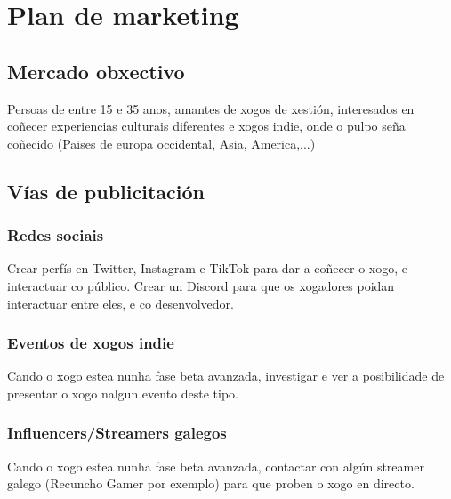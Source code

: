 \documentclass{report}  %
\begin{document}
\section{Plan de marketing}
\subsection{Mercado obxectivo}
Persoas de entre 15 e 35 anos, amantes de xogos de xestión, interesados en coñecer experiencias culturais diferentes e xogos indie, onde o pulpo seña coñecido (Paises de europa occidental, Asia, America,...)

\subsection{Vías de publicitación}
\subsubsection{Redes sociais}
Crear perfís en Twitter, Instagram e TikTok para dar a coñecer o xogo, e interactuar co público. Crear un Discord para que os xogadores poidan interactuar entre eles, e co desenvolvedor.
\subsubsection{Eventos de xogos indie}
Cando o xogo estea nunha fase beta avanzada, investigar e ver a posibilidade de presentar o xogo nalgun evento deste tipo.
\subsubsection{Influencers/Streamers galegos}
Cando o xogo estea nunha fase beta avanzada, contactar con algún streamer galego (Recuncho Gamer por exemplo) para que proben o xogo en directo.
\end{document}
